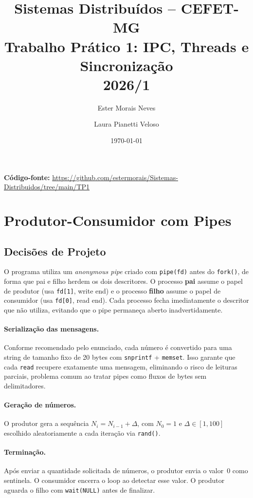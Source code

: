 \documentclass[12pt,a4paper]{article}
\title{
    \textbf{Sistemas Distribuídos -- CEFET-MG}\\
    \large Trabalho Prático 1: IPC, Threads e Sincronização\\
    2026/1
}
\author{Ester Morais Neves \and Laura Pianetti Veloso}
\date{\today}
\begin{document}
\maketitle
\thispagestyle{empty}

\textbf{Código-fonte:} \url{https://github.com/estermorais/Sistemas-Distribuidos/tree/main/TP1}

\section{Produtor-Consumidor com Pipes}

\subsection{Decisões de Projeto}

O programa utiliza um \emph{anonymous pipe} criado com \texttt{pipe(fd)} antes
do \texttt{fork()}, de forma que pai e filho herdem os dois descritores.
O processo \textbf{pai} assume o papel de produtor (usa \texttt{fd[1]}, write end)
e o processo \textbf{filho} assume o papel de consumidor (usa \texttt{fd[0]}, read
end). Cada processo fecha imediatamente o descritor que não utiliza, evitando
que o pipe permaneça aberto inadvertidamente.

\paragraph{Serialização das mensagens.}
Conforme recomendado pelo enunciado, cada número é convertido para uma string
de tamanho fixo de 20 bytes com \texttt{snprintf} + \texttt{memset}.
Isso garante que cada \texttt{read} recupere exatamente uma mensagem,
eliminando o risco de leituras parciais, problema comum ao tratar pipes como
fluxos de bytes sem delimitadores.

\paragraph{Geração de números.}
O produtor gera a sequência $N_i = N_{i-1} + \Delta$, com $N_0 = 1$ e
$\Delta \in [1, 100]$ escolhido aleatoriamente a cada iteração via
\texttt{rand()}.

\paragraph{Terminação.}
Após enviar a quantidade solicitada de números, o produtor envia o valor~$0$
como sentinela. O consumidor encerra o loop ao detectar esse valor.
O produtor aguarda o filho com \texttt{wait(NULL)} antes de finalizar.
\end{document}
